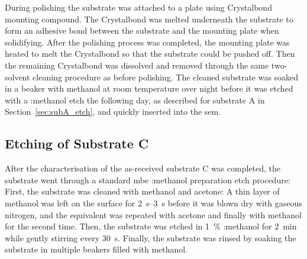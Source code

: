 During polishing the substrate was attached to a plate using Crystalbond mounting compound. The Crystalbond was melted underneath the substrate to form an adhesive bond between the substrate and the mounting plate when solidifying. After the polishing process was completed, the mounting plate was heated to melt the Crystalbond so that the substrate could be pushed off. Then the remaining Crystalbond was dissolved and removed through the same two-solvent cleaning procedure as before polishing. The cleaned substrate was soaked in a beaker with methanol at room temperature over night before it was etched with a :methanol etch the following day, as described for substrate A in Section~\ref{sec:subA_etch}, and quickly inserted into the \ac{sem}.

\subsection{Etching of Substrate C}

After the characterisation of the as-received substrate C was completed, the substrate went through a standard \ac{mbe} :methanol preparation etch procedure: First, the substrate was cleaned with methanol and acetone: A thin layer of methanol was left on the surface for \SIrange{2}{3}{\second} before it was blown dry with gaseous nitrogen, and the equivalent was repeated with acetone and finally with methanol for the second time. Then, the substrate was etched in \SI{1}{\percent} :methanol for \SI{2}{\minute} while gently stirring every \SI{30}{\second}. Finally, the substrate was rinsed by soaking the substrate in multiple beakers filled with methanol.



